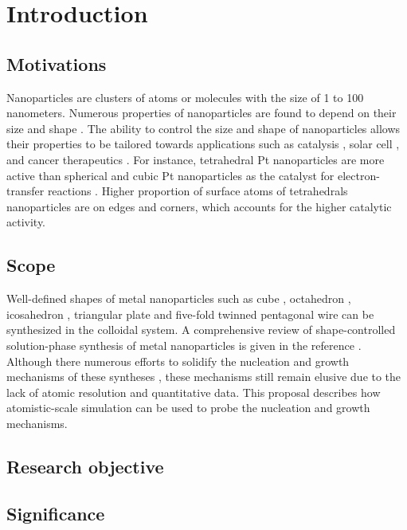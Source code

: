 \section{Introduction}

\subsection{Motivations}

Nanoparticles are clusters of atoms or molecules with the size of 1 to 100 nanometers. Numerous properties of nanoparticles are found to depend on their size \cite{Roduner_2006} and shape \cite{Xia_2008}. The ability to control the size and shape of nanoparticles allows their properties to be tailored towards applications such as catalysis \cite{astruc2008nanoparticles,Astruc_2006}, solar cell \cite{Atwater_2010}, and cancer therapeutics \cite{Jain_2010,Kim_2010}. For instance, tetrahedral Pt nanoparticles are more active than spherical and cubic Pt nanoparticles as the catalyst for electron-transfer reactions \cite{Narayanan_2005}. Higher proportion of surface atoms of tetrahedrals nanoparticles are on edges and corners, which accounts for the higher catalytic activity.

\subsection{Scope}

Well-defined shapes of metal nanoparticles such as cube \cite{Im_2005}, octahedron \cite{Xia_2012}, icosahedron \cite{Xiong_2007}, triangular plate \cite{Lofton_2005} and five-fold twinned pentagonal wire \cite{Tsuji_2008} can be synthesized in the colloidal system. A comprehensive review of shape-controlled solution-phase synthesis of metal nanoparticles is given in the reference \cite{Xia_2008}. Although there numerous efforts to solidify the nucleation and growth mechanisms of these syntheses \cite{Lofton_2005,Mariscal_2012,Park_2013,Viswanath_2009,Liao_2014,Chang_2011,Murph_2015}, these mechanisms still remain elusive due to the lack of atomic resolution and quantitative data. This proposal describes how atomistic-scale simulation can be used to probe the nucleation and growth mechanisms.

\subsection{Research objective}

\subsection{Significance}